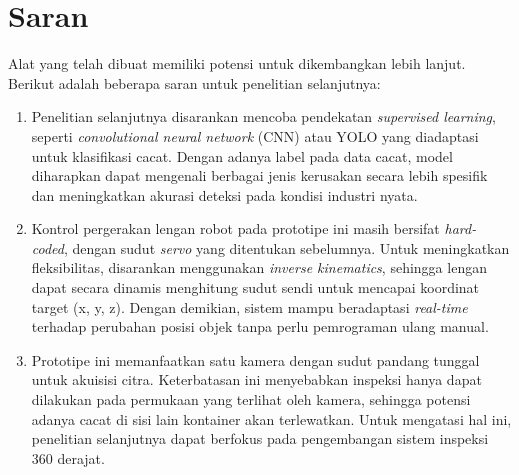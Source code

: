 \section{Saran}
Alat yang telah dibuat memiliki potensi untuk dikembangkan lebih
lanjut. Berikut adalah beberapa saran untuk penelitian selanjutnya:
\begin{enumerate}
  \item Penelitian selanjutnya disarankan mencoba pendekatan
    \textit{supervised learning}, seperti \textit{convolutional
    neural network} (CNN)
    atau YOLO yang diadaptasi untuk klasifikasi cacat. Dengan adanya
    label pada data cacat, model diharapkan dapat mengenali berbagai
    jenis kerusakan secara lebih spesifik dan meningkatkan akurasi
    deteksi pada kondisi industri nyata.
  \item Kontrol pergerakan lengan robot pada prototipe ini masih
    bersifat \textit{hard-coded}, dengan sudut \textit{servo} yang ditentukan
    sebelumnya. Untuk meningkatkan fleksibilitas, disarankan
    menggunakan \textit{inverse kinematics}, sehingga lengan dapat secara
    dinamis menghitung sudut sendi untuk mencapai koordinat target
    (x, y, z). Dengan demikian, sistem mampu beradaptasi \textit{real-time}
    terhadap perubahan posisi objek tanpa perlu pemrograman ulang manual.
  \item Prototipe ini memanfaatkan satu kamera dengan sudut pandang
    tunggal untuk akuisisi citra. Keterbatasan ini menyebabkan
    inspeksi hanya dapat dilakukan pada permukaan yang terlihat oleh
    kamera, sehingga potensi adanya cacat di sisi lain kontainer akan
    terlewatkan. Untuk mengatasi hal ini, penelitian selanjutnya
    dapat berfokus pada pengembangan sistem inspeksi 360 derajat.
\end{enumerate}
